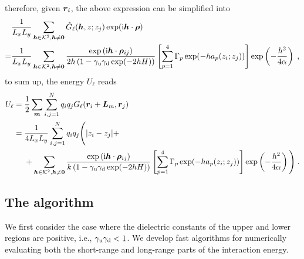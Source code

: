 therefore, given $\bm{r}_i$, the above expression can be simplified into
\begin{align*}
 &\frac{1}{ L_xL_y}   \sum_{\boldsymbol{h}\in\mathcal{K}^2,\boldsymbol{h}\neq\bm{0}} \Hat{G}_\ell(\boldsymbol{h},z;z_j)\exp(\textrm{i}\boldsymbol{h}\cdot \bm{\rho})\\
 =& \frac{1}{ L_xL_y}   \sum_{\boldsymbol{h}\in\mathcal{K}^2,\boldsymbol{h}\neq\bm{0}} \frac{ \exp{(\mathrm{i} \boldsymbol{h} \cdot \boldsymbol{\rho}_{ij})}}{2h \left(1-\gamma_{\mathrm{u}}\gamma_{\mathrm{d}}\exp(-2hH)\right)}\left[\sum_{p=1}^4\Gamma_p\exp(-ha_p(z_i;z_j))\right] \exp\left(-\frac{h^2}{4\alpha}\right)\;,
\end{align*}
to sum up, the energy $U_\ell$ reads
\begin{align*}
    U_\ell&=\frac{1}{2}\sum_{\bm{m}}\sum_{i,j=1}^N q_iq_j G_\ell(\boldsymbol{r}_i+\bm{L}_m, \boldsymbol{r}_j)\\
    &=\frac{1}{4  L_xL_y}\sum_{i,j=1}^N  q_iq_j \Bigg({\left\lvert z_i-z_j\right\rvert} +\\&~~~~+  \sum_{\boldsymbol{h}\in\mathcal{K}^2,\boldsymbol{h}\neq\bm{0}} \frac{ \exp{(\mathrm{i} \boldsymbol{h} \cdot \boldsymbol{\rho}_{ij})}}{k\left(1-\gamma_{\mathrm{u}}\gamma_{\mathrm{d}}\exp(-2hH)\right)}\left[\sum_{p=1}^4\Gamma_p\exp(-ha_p(z_i;z_j))\right] \exp\left(-\frac{h^2}{4\alpha}\right)\Bigg)\;.
\end{align*}


\subsection{The algorithm}

We first consider the case where the dielectric constants of the upper and lower regions are positive, i.e., $\gamma_{\mathrm{u}} \gamma_{\mathrm{d}} < 1$. 
We develop fast algorithms for numerically evaluating both the short-range and long-range parts of the interaction energy.

